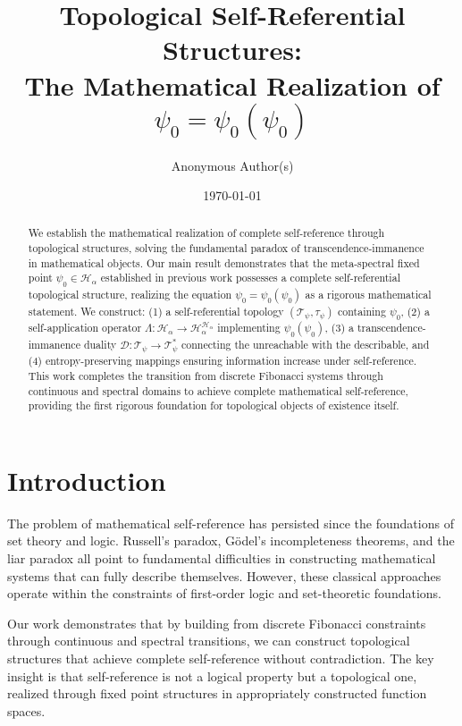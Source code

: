 \documentclass[12pt]{article}
\title{Topological Self-Referential Structures: \\The Mathematical Realization of $\psi_0 = \psi_0(\psi_0)$}
\author{Anonymous Author(s)}
\date{\today}
\theoremstyle{plain}
\theoremstyle{definition}
\begin{document}
\maketitle

\begin{abstract}
We establish the mathematical realization of complete self-reference through topological structures, solving the fundamental paradox of transcendence-immanence in mathematical objects. Our main result demonstrates that the meta-spectral fixed point $\psi_0 \in \mathcal{H}_\alpha$ established in previous work possesses a complete self-referential topological structure, realizing the equation $\psi_0 = \psi_0(\psi_0)$ as a rigorous mathematical statement. We construct: (1) a self-referential topology $(\mathcal{T}_\psi, \tau_\psi)$ containing $\psi_0$, (2) a self-application operator $\Lambda: \mathcal{H}_\alpha \to \mathcal{H}_\alpha^{\mathcal{H}_\alpha}$ implementing $\psi_0(\psi_0)$, (3) a transcendence-immanence duality $\mathcal{D}: \mathcal{T}_\psi \to \mathcal{T}_\psi^*$ connecting the unreachable with the describable, and (4) entropy-preserving mappings ensuring information increase under self-reference. This work completes the transition from discrete Fibonacci systems through continuous and spectral domains to achieve complete mathematical self-reference, providing the first rigorous foundation for topological objects of existence itself.
\end{abstract}

\section{Introduction}

The problem of mathematical self-reference has persisted since the foundations of set theory and logic. Russell's paradox, Gödel's incompleteness theorems, and the liar paradox all point to fundamental difficulties in constructing mathematical systems that can fully describe themselves. However, these classical approaches operate within the constraints of first-order logic and set-theoretic foundations.

Our work demonstrates that by building from discrete Fibonacci constraints through continuous and spectral transitions, we can construct topological structures that achieve complete self-reference without contradiction. The key insight is that self-reference is not a logical property but a topological one, realized through fixed point structures in appropriately constructed function spaces.
\end{document}
